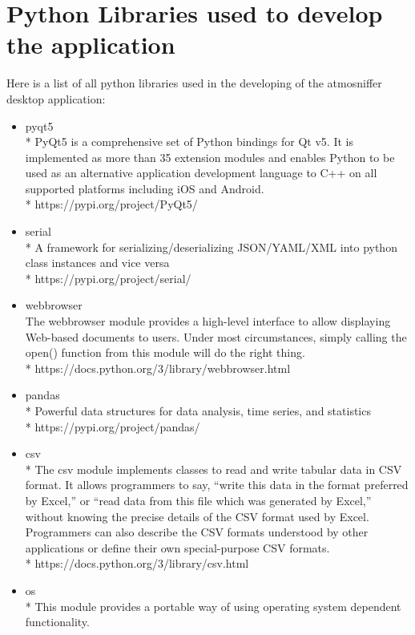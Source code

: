 \chapter{Python Libraries used to develop the application} %
	Here is a list of all python libraries used in the developing of the atmosniffer desktop application:
\begin{itemize}
	\item pyqt5
		\\* PyQt5 is a comprehensive set of Python bindings for Qt v5. It is implemented as more than 35 extension modules and enables Python to be used as an alternative application development language to C++ on all supported platforms including iOS and Android.
		\\* https://pypi.org/project/PyQt5/
	\item serial
		\\*  A framework for serializing/deserializing JSON/YAML/XML into python class instances and vice versa
		\\* https://pypi.org/project/serial/
	\item webbrowser
		\\ The webbrowser module provides a high-level interface to allow displaying Web-based documents to users. Under most circumstances, simply calling the open() function from this module will do the right thing.
		\\* https://docs.python.org/3/library/webbrowser.html
	\item pandas
		\\* Powerful data structures for data analysis, time series, and statistics
		\\* https://pypi.org/project/pandas/
	\item csv
		\\* The csv module implements classes to read and write tabular data in CSV format. It allows programmers to say, “write this data in the format preferred by Excel,” or “read data from this file which was generated by Excel,” without knowing the precise details of the CSV format used by Excel. Programmers can also describe the CSV formats understood by other applications or define their own special-purpose CSV formats.
		\\* https://docs.python.org/3/library/csv.html
	\item os
		\\* This module provides a portable way of using operating system dependent functionality.

\end{itemize}
